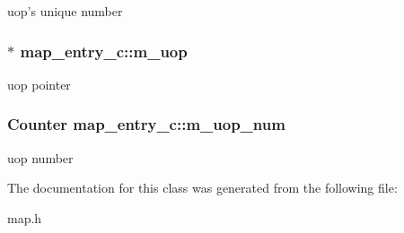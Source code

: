 \label{classmap__entry__c_a0a8a7d10cd323dd0df59c45f4af1e464}
uop's unique number \hypertarget{classmap__entry__c_ab6464a295f3c4c34ab222df2cd521b48}{
\subsubsection[{m\_\-uop}]{$\ast$ {\bf map\_\-entry\_\-c::m\_\-uop}}}
\label{classmap__entry__c_ab6464a295f3c4c34ab222df2cd521b48}
uop pointer \hypertarget{classmap__entry__c_a8652b806200144aa94a38f420aee08d2}{
\subsubsection[{m\_\-uop\_\-num}]{\setlength{\rightskip}{0pt plus 5cm}Counter {\bf map\_\-entry\_\-c::m\_\-uop\_\-num}}}
\label{classmap__entry__c_a8652b806200144aa94a38f420aee08d2}
uop number 

The documentation for this class was generated from the following file:\begin{DoxyCompactItemize}
\item 
map.h\end{DoxyCompactItemize}
